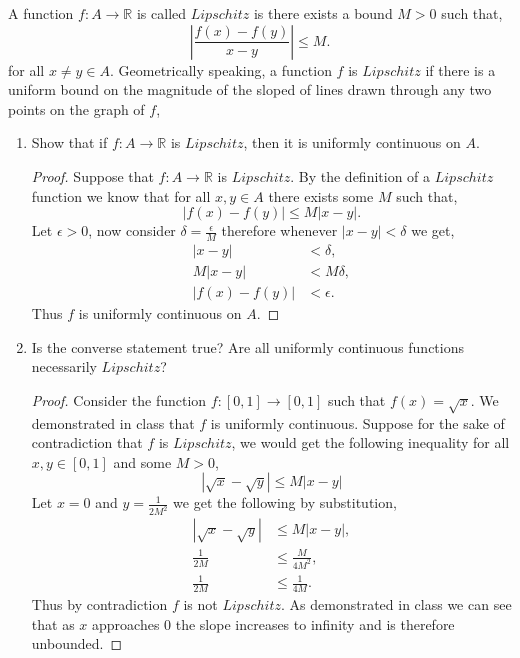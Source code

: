 \documentclass[12pt]{article}
\makeatletter
\theoremstyle{homework}
\newenvironment{exercise}[1]
{\def\@currentlabel{#1}\exercisecore}
{\endexercisecore}
\newcommand{\Reals}{\ensuremath{\mathbb R}}
\makeatother
\begin{document}
\begin{exercise}{Abbott 4.4.9} A function $f: A \to \Reals$ is called $Lipschitz$ is there exists a bound $M>0$ such that,
  \begin{equation*}
    |\dfrac{f(x) - f(y)}{x - y}|\le M.
  \end{equation*}
for all $x \neq y \in A$. Geometrically speaking, a function $f$ is $Lipschitz$ if there is a uniform bound on the magnitude
of the sloped of lines drawn through any two points on the graph of $f$,\\


\begin{enumerate}
  \item Show that if $f: A \to \Reals$ is $Lipschitz$, then it is uniformly continuous on $A$.\\
  \begin{proof}
    Suppose that $f: A \to \Reals$ is $Lipschitz$. By the definition of a $Lipschitz$ function we know that for all $x,y \in A$ there
    exists some $M$ such that,
    \begin{equation*}
      |f(x) - f(y)| \le M|x - y|.
    \end{equation*}
    Let $\epsilon > 0$, now consider $\delta = \frac{\epsilon}{M}$ therefore whenever $|x - y|<\delta$ we get,
    \begin{align*}
      |x - y| &< \delta,\\
      M|x - y| &< M\delta,\\
      |f(x) - f(y)| &< \epsilon.
    \end{align*}
    Thus $f$ is uniformly continuous on $A$.
  \end{proof}
  \vspace{.25in}



  \item Is the converse statement true? Are all uniformly continuous functions necessarily $Lipschitz$?\\
  \begin{proof}
    Consider the function $f: [0,1] \to [0,1]$ such that $f(x) =\sqrt{x}$. We demonstrated in class that $f$ is uniformly continuous. Suppose 
    for the sake of contradiction that $f$ is $Lipschitz$, we would get the following inequality for all $x,y \in [0,1]$ and some $M>0$,
    \begin{equation*}
      |\sqrt{x} - \sqrt{y}|\le M|x - y|
    \end{equation*}
    Let $x = 0$ and $y = \frac{1}{2M^2}$ we get the following by substitution,
    \begin{align*}
      |\sqrt{x} - \sqrt{y}|&\le M|x - y|,\\
      \frac{1}{2M}&\le \frac{M}{4M^2},\\
      \frac{1}{2M}&\le \frac{1}{4M}.
    \end{align*}
    Thus by contradiction $f$ is not $Lipschitz$. As demonstrated in class we can see that as $x$ approaches 0 the slope increases to infinity and is therefore unbounded.  
  \end{proof}
  









\end{enumerate}
\end{exercise}
\end{document}
